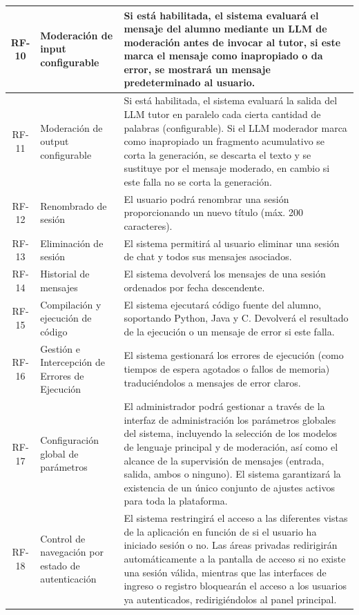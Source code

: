 \begin{longtable}{|c|p{3.5cm}|p{9cm}|}
  RF-10 & Moderación de input configurable & Si está habilitada, el sistema evaluará el mensaje del alumno mediante un LLM de moderación antes de invocar al tutor, si este marca el mensaje como inapropiado o da error, se mostrará un mensaje predeterminado al usuario. \\ \hline
  \rowcolor{ulepsbased} RF-11 & Moderación de output configurable & Si está habilitada, el sistema evaluará la salida del LLM tutor en paralelo cada cierta cantidad de palabras (configurable). Si el LLM moderador marca como inapropiado un fragmento acumulativo se corta la generación, se descarta el texto y se sustituye por el mensaje moderado, en cambio si este falla no se corta la generación. \\ \hline
  RF-12 & Renombrado de sesión & El usuario podrá renombrar una sesión proporcionando un nuevo título (máx. 200 caracteres). \\ \hline
  \rowcolor{ulepsbased} RF-13 & Eliminación de sesión & El sistema permitirá al usuario eliminar una sesión de chat y todos sus mensajes asociados. \\ \hline
  RF-14 & Historial de mensajes & El sistema devolverá los mensajes de una sesión ordenados por fecha descendente. \\ \hline
  \rowcolor{ulepsbased} RF-15 & Compilación y ejecución de código & El sistema ejecutará código fuente del alumno, soportando Python, Java y C. Devolverá el resultado de la ejecución o un mensaje de error si este falla. \\ \hline
  RF-16 & Gestión e Intercepción de Errores de Ejecución & El sistema gestionará los errores de ejecución (como tiempos de espera agotados o fallos de memoria) traduciéndolos a mensajes de error claros. \\ \hline
  \rowcolor{ulepsbased} RF-17 & Configuración global de parámetros & El administrador podrá gestionar a través de la interfaz de administración los parámetros globales del sistema, incluyendo la selección de los modelos de lenguaje principal y de moderación, así como el alcance de la supervisión de mensajes (entrada, salida, ambos o ninguno). El sistema garantizará la existencia de un único conjunto de ajustes activos para toda la plataforma. \\ \hline
  RF-18 & Control de navegación por estado de autenticación & El sistema restringirá el acceso a las diferentes vistas de la aplicación en función de si el usuario ha iniciado sesión o no. Las áreas privadas redirigirán automáticamente a la pantalla de acceso si no existe una sesión válida, mientras que las interfaces de ingreso o registro bloquearán el acceso a los usuarios ya autenticados, redirigiéndolos al panel principal. \\ \hline
\end{longtable}
\endgroup